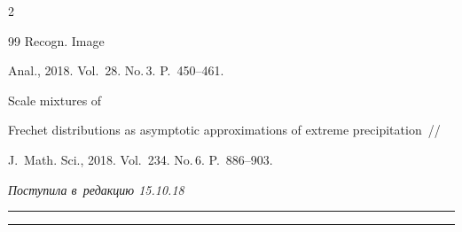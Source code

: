 \begin{multicols}{2}
{{\begin{thebibliography}{99}
Recogn. Image


Anal., 2018. Vol.~28. No.\,3. P.~450--461.







 Scale mixtures of


Frechet distributions as asymptotic approximations of extreme precipitation~// 


J.~Math. Sci., 2018. Vol.~234. No.\,6. P.~886--903.


 \end{thebibliography}





 }


 }





\end{multicols}





\vspace*{-11pt}





\hfill{\small\textit{Поступила в~редакцию 15.10.18}}





\vspace*{5pt}




















\hrule





\vspace*{2pt}





\hrule





\vspace*{-4pt}





